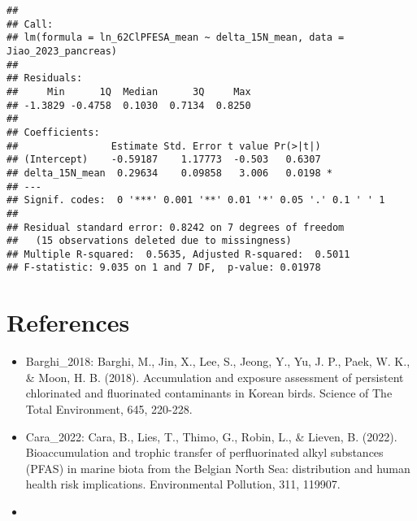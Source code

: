 \documentclass[
]{article}
\providecommand{\tightlist}{%
  \setlength{\itemsep}{0pt}\setlength{\parskip}{0pt}}
\begin{document}
\begin{verbatim}
## 
## Call:
## lm(formula = ln_62ClPFESA_mean ~ delta_15N_mean, data = Jiao_2023_pancreas)
## 
## Residuals:
##     Min      1Q  Median      3Q     Max 
## -1.3829 -0.4758  0.1030  0.7134  0.8250 
## 
## Coefficients:
##                Estimate Std. Error t value Pr(>|t|)  
## (Intercept)    -0.59187    1.17773  -0.503   0.6307  
## delta_15N_mean  0.29634    0.09858   3.006   0.0198 *
## ---
## Signif. codes:  0 '***' 0.001 '**' 0.01 '*' 0.05 '.' 0.1 ' ' 1
## 
## Residual standard error: 0.8242 on 7 degrees of freedom
##   (15 observations deleted due to missingness)
## Multiple R-squared:  0.5635, Adjusted R-squared:  0.5011 
## F-statistic: 9.035 on 1 and 7 DF,  p-value: 0.01978
\end{verbatim}

\section{References}\label{references}

\begin{itemize}
\tightlist
\item
  Barghi\_2018: Barghi, M., Jin, X., Lee, S., Jeong, Y., Yu, J. P.,
  Paek, W. K., \& Moon, H. B. (2018). Accumulation and exposure
  assessment of persistent chlorinated and fluorinated contaminants in
  Korean birds. Science of The Total Environment, 645, 220-228.
\item
  Cara\_2022: Cara, B., Lies, T., Thimo, G., Robin, L., \& Lieven, B.
  (2022). Bioaccumulation and trophic transfer of perfluorinated alkyl
  substances (PFAS) in marine biota from the Belgian North Sea:
  distribution and human health risk implications. Environmental
  Pollution, 311, 119907.
\item
\end{itemize}
\end{document}
